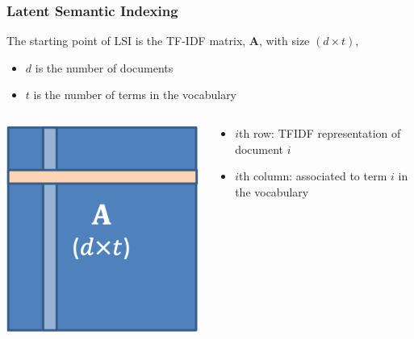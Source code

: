 \documentclass{beamer}
\begin{document}
\begin{frame}
\frametitle{Latent Semantic Indexing}
    
    The starting point of LSI is the TF-IDF matrix, $\mathbf A$, with size $(d \times t)$,
    \begin{itemize}
        \item $d$ is the number of documents
        \item $t$ is the number of terms in the vocabulary
    \end{itemize}
    
    \vspace{1cm}
    
    \begin{columns}
        \begin{column}{0.3\textwidth}
        \centerline{\includegraphics[width=.7\textwidth]{./figs/TFIDF_matrix.png}}
        \end{column}
        \begin{column}{0.5\textwidth}  %
        \begin{itemize}
            \item $i$th row: TFIDF representation of document $i$
            \item $i$th column: associated to term $i$ in the vocabulary
        \end{itemize}
        \end{column}
    \end{columns}
    
    
    
\end{frame}
\end{document}
